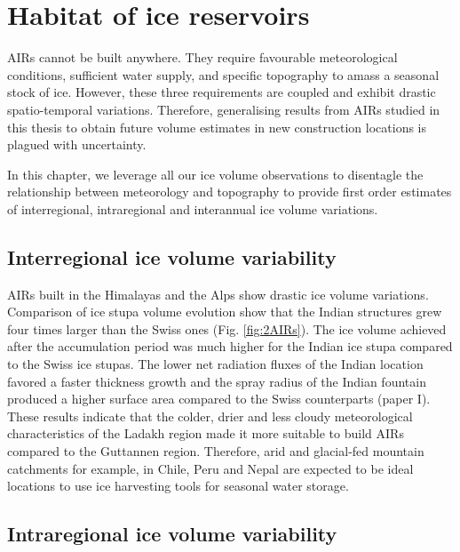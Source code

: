 \chapter{Habitat of ice reservoirs}


\ac{AIRs} cannot be built anywhere. They require favourable meteorological conditions, sufficient water supply,
and specific topography to amass a seasonal stock of ice. However, these three requirements are coupled and
exhibit drastic spatio-temporal variations. Therefore, generalising results from AIRs studied in this thesis to
obtain future volume estimates in new construction locations is plagued with uncertainty.

In this chapter, we leverage all our ice volume observations to disentagle the relationship between meteorology
and topography to provide first order estimates of interregional, intraregional and interannual ice volume
variations. 

\section{Interregional ice volume variability}

\ac{AIRs} built in the Himalayas and the Alps show drastic ice volume variations. Comparison of ice stupa volume
evolution show that the Indian structures grew four times larger than the Swiss ones (Fig. \ref{fig:2AIRs}). The
ice volume achieved after the accumulation period was much higher for the Indian ice stupa compared to the Swiss
ice stupas. The lower net radiation fluxes of the Indian location favored a faster thickness growth and the
spray radius of the Indian fountain produced a higher surface area compared to the Swiss counterparts (paper I).
These results indicate that the colder, drier and less cloudy meteorological characteristics of the Ladakh
region made it more suitable to build \ac{AIRs} compared to the Guttannen region. Therefore, arid and
glacial-fed mountain catchments for example, in Chile, Peru and Nepal are expected to be ideal locations to use
ice harvesting tools for seasonal water storage.

\section{Intraregional ice volume variability}

